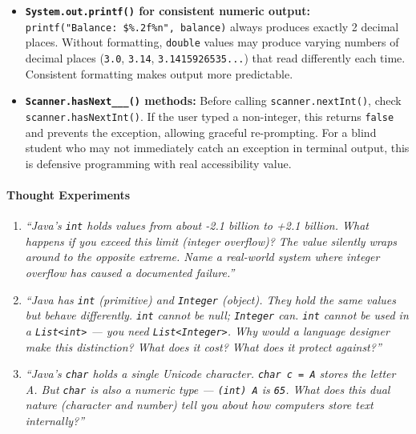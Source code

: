 \documentclass[
  justified,
  openright,
]{tufte-book}
\let\paragraph\paragraph
\let\paragraph\paragraph
\begin{document}
\begin{itemize}
\item
  \textbf{\texttt{System.out.printf()} for consistent numeric output:}
  \texttt{printf("Balance:\ \$\%.2f\%n",\ balance)} always produces
  exactly 2 decimal places. Without formatting, \texttt{double} values
  may produce varying numbers of decimal places (\texttt{3.0},
  \texttt{3.14}, \texttt{3.1415926535...}) that read differently each
  time. Consistent formatting makes output more predictable.
\item
  \textbf{\texttt{Scanner.hasNext\_\_\_()} methods:} Before calling
  \texttt{scanner.nextInt()}, check \texttt{scanner.hasNextInt()}. If
  the user typed a non-integer, this returns \texttt{false} and prevents
  the exception, allowing graceful re-prompting. For a blind student who
  may not immediately catch an exception in terminal output, this is
  defensive programming with real accessibility value.
\end{itemize}

\paragraph{Thought Experiments}\label{thought-experiments-32}

\begin{enumerate}
\def\labelenumi{\arabic{enumi}.}
\item
  \emph{``Java's \texttt{int} holds values from about -2.1 billion to
  +2.1 billion. What happens if you exceed this limit (integer
  overflow)? The value silently wraps around to the opposite extreme.
  Name a real-world system where integer overflow has caused a
  documented failure.''}
\item
  \emph{``Java has \texttt{int} (primitive) and \texttt{Integer}
  (object). They hold the same values but behave differently.
  \texttt{int} cannot be null; \texttt{Integer} can. \texttt{int} cannot
  be used in a \texttt{List\textless{}int\textgreater{}} --- you need
  \texttt{List\textless{}Integer\textgreater{}}. Why would a language
  designer make this distinction? What does it cost? What does it
  protect against?''}
\item
  \emph{``Java's \texttt{char} holds a single Unicode character.
  \texttt{char\ c\ =\ \textquotesingle{}A\textquotesingle{}} stores the
  letter A. But \texttt{char} is also a numeric type ---
  \texttt{(int)\ \textquotesingle{}A\textquotesingle{}} is \texttt{65}.
  What does this dual nature (character and number) tell you about how
  computers store text internally?''}
\end{enumerate}
\end{document}
